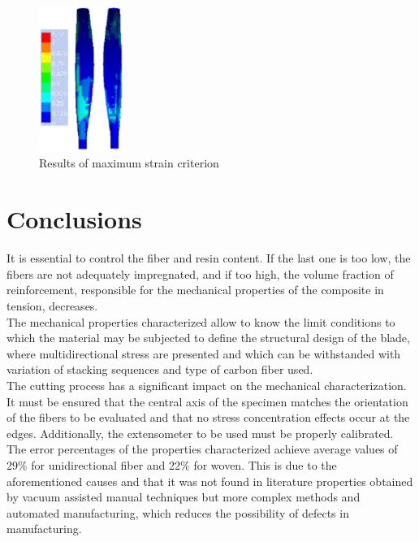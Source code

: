 \begin{figure}[H]
  \includegraphics[width=0.25\textwidth]{p13}
\caption{Results of maximum strain criterion }
\label{fig:20}       %
\end{figure}

\section{Conclusions}
\label{sec:6}
It is essential to control the fiber and resin content. If the last one is too low, the fibers are not adequately impregnated, and if too high, the volume fraction of reinforcement, responsible for the mechanical properties of the composite in tension, decreases.\\

The mechanical properties characterized allow to know the limit conditions to which the material may be subjected to define the structural design of the blade, where multidirectional stress are presented and which can be withstanded with variation of stacking sequences and type of carbon fiber used.\\

The cutting process has a significant impact on the mechanical characterization. It must be ensured that the central axis of the specimen matches the orientation of the fibers to be evaluated and that no stress concentration effects occur at the edges. Additionally, the extensometer to be used must be properly calibrated.\\

The error percentages of the properties characterized achieve average values of 29{\%} for unidirectional fiber and 22{\%} for woven. This is due to the aforementioned causes and that it was not found in literature properties obtained by vacuum assisted manual techniques but more complex methods and automated manufacturing, which reduces the possibility of defects in manufacturing.\\

